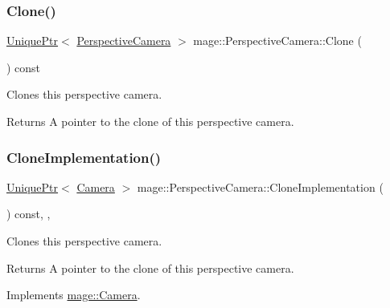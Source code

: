 \subsubsection{\texorpdfstring{Clone()}{Clone()}}
{\footnotesize\ttfamily \hyperlink{namespacemage_a3316d7143a973e37adf1110f2e80ca31}{Unique\+Ptr}$<$ \hyperlink{classmage_1_1_perspective_camera}{Perspective\+Camera} $>$ mage\+::\+Perspective\+Camera\+::\+Clone (\begin{DoxyParamCaption}{ }\end{DoxyParamCaption}) const}

Clones this perspective camera.

\begin{DoxyReturn}{Returns}
A pointer to the clone of this perspective camera. 
\end{DoxyReturn}
\hypertarget{classmage_1_1_perspective_camera_aa597ab884256b7e6fad63653af3ac789}{}\label{classmage_1_1_perspective_camera_aa597ab884256b7e6fad63653af3ac789} 
\subsubsection{\texorpdfstring{Clone\+Implementation()}{CloneImplementation()}}
{\footnotesize\ttfamily \hyperlink{namespacemage_a3316d7143a973e37adf1110f2e80ca31}{Unique\+Ptr}$<$ \hyperlink{classmage_1_1_camera}{Camera} $>$ mage\+::\+Perspective\+Camera\+::\+Clone\+Implementation (\begin{DoxyParamCaption}{ }\end{DoxyParamCaption}) const\hspace{0.3cm}{\ttfamily [override]}, {\ttfamily [private]}, {\ttfamily [virtual]}}

Clones this perspective camera.

\begin{DoxyReturn}{Returns}
A pointer to the clone of this perspective camera. 
\end{DoxyReturn}


Implements \hyperlink{classmage_1_1_camera_aedf6e7d6ee6c6e9e82da814ef8e705ab}{mage\+::\+Camera}.

\hypertarget{classmage_1_1_perspective_camera_a500edd42c62a757af0c019e720571251}{}\label{classmage_1_1_perspective_camera_a500edd42c62a757af0c019e720571251} 
